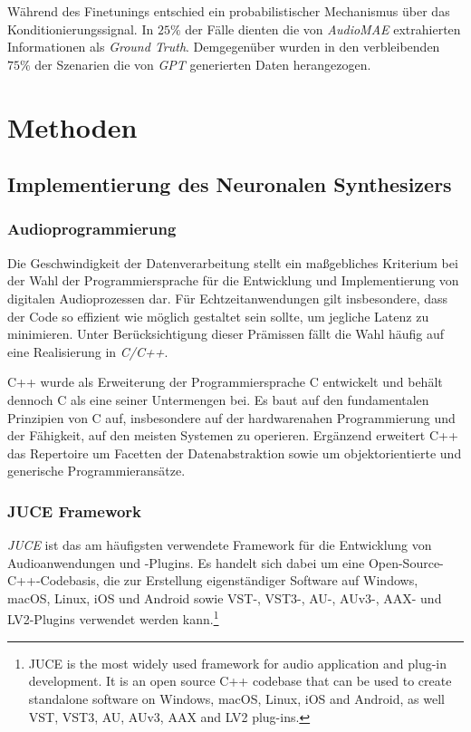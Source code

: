 \documentclass[
  a4paper,  %
  twoside,  %
  bibliography=totoc,
  headsepline,
  cleardoublepage=empty,
  parskip=half,
  draft=false
]{scrbook}
\begin{document}
Während des Finetunings entschied ein probabilistischer Mechanismus über das Konditionierungssignal. In $25\%$ der Fälle dienten die von \emph{AudioMAE} extrahierten Informationen als \emph{Ground Truth}. Demgegenüber wurden in den verbleibenden $75\%$ der Szenarien die von \emph{GPT} generierten Daten herangezogen. \cite{liu_audioldm2_2023}

\chapter{Methoden}
\section{Implementierung des Neuronalen Synthesizers}
\subsection{Audioprogrammierung}
Die Geschwindigkeit der Datenverarbeitung stellt ein maßgebliches Kriterium bei der Wahl der Programmiersprache für die Entwicklung und Implementierung von digitalen Audioprozessen dar. Für Echtzeitanwendungen gilt insbesondere, dass der Code so effizient wie möglich gestaltet sein sollte, um jegliche Latenz zu minimieren. Unter Berücksichtigung dieser Prämissen fällt die Wahl häufig auf eine Realisierung in \emph{C/C++}. \cite{doumler_c_2015, boulanger_audio_2011}

C++ wurde als Erweiterung der Programmiersprache C entwickelt und behält dennoch C als eine seiner Untermengen bei. Es baut auf den fundamentalen Prinzipien von C auf, insbesondere auf der hardwarenahen Programmierung und der Fähigkeit, auf den meisten Systemen zu operieren. Ergänzend erweitert C++ das Repertoire um Facetten der Datenabstraktion sowie um objektorientierte und generische Programmieransätze. \cite{stroustrup_c_1997}

\subsection{JUCE Framework}
\glqq\emph{JUCE} ist das am häufigsten verwendete Framework für die Entwicklung von Audioanwendungen und -Plugins. Es handelt sich dabei um eine Open-Source-C++-Codebasis, die zur Erstellung eigenständiger Software auf Windows, macOS, Linux, iOS und Android sowie VST-, VST3-, AU-, AUv3-, AAX- und LV2-Plugins verwendet werden kann.\grqq \footnote{
JUCE is the most widely used framework for audio application and plug-in development. It is an open source C++ codebase that can be used to create standalone software on Windows, macOS, Linux, iOS and Android, as well VST, VST3, AU, AUv3, AAX and LV2 plug-ins.
} \cite{noauthor_juce_nodate}
\end{document}
